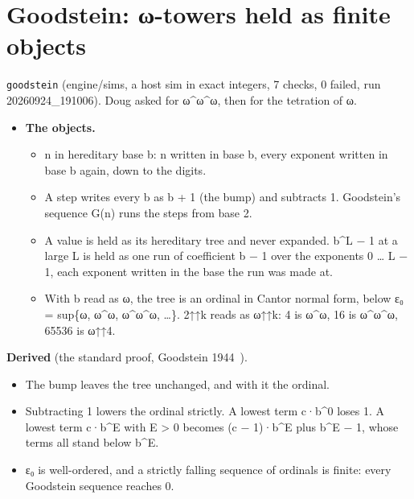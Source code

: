 \section{\texorpdfstring{Goodstein: ω-towers held as finite objects}{Goodstein: ω-towers held as finite objects}}

\texttt{goodstein} (engine/sims, a host sim in exact integers, 7 checks, 0 failed, run 20260924\_\allowbreak{}191006). Doug asked for ω\textasciicircum{}ω\textasciicircum{}ω, then for the tetration of ω.

\begin{itemize}
\item \textbf{The objects.}

\begin{itemize}
\item n in hereditary base b: n written in base b, every exponent written in base b again, down to the digits.
\item A step writes every b as b + 1 (the bump) and subtracts 1. Goodstein's sequence G(n) runs the steps from base 2.
\item A value is held as its hereditary tree and never expanded. b\textasciicircum{}L − 1 at a large L is held as one run of coefficient b − 1 over the exponents 0 … L − 1, each exponent written in the base the run was made at.
\item With b read as ω, the tree is an ordinal in Cantor normal form, below ε₀ = sup\{ω, ω\textasciicircum{}ω, ω\textasciicircum{}ω\textasciicircum{}ω, …\}. 2↑↑k reads as ω↑↑k: 4 is ω\textasciicircum{}ω, 16 is ω\textasciicircum{}ω\textasciicircum{}ω, 65536 is ω↑↑4.
\end{itemize}
\end{itemize}

\textbf{Derived} (the standard proof, Goodstein 1944~\cite{src:Goodstein-1944}).

\begin{itemize}
\item The bump leaves the tree unchanged, and with it the ordinal.
\item Subtracting 1 lowers the ordinal strictly. A lowest term c·b\textasciicircum{}0 loses 1. A lowest term c·b\textasciicircum{}E with E > 0 becomes (c − 1)·b\textasciicircum{}E plus b\textasciicircum{}E − 1, whose terms all stand below b\textasciicircum{}E.
\item ε₀ is well-ordered, and a strictly falling sequence of ordinals is finite: every Goodstein sequence reaches 0.
\end{itemize}

